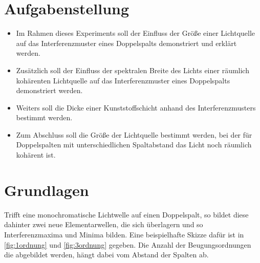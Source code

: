 \documentclass[11pt,ngerman]{scrartcl}
\begin{document}

\tableofcontents
\newpage

\section{Aufgabenstellung\label{Auf0}}

\begin{itemize}
	\item Im Rahmen dieses Experiments soll der Einfluss der Größe einer Lichtquelle auf das Interferenzmuster eines Doppelspalts demonstriert und erklärt werden.

	\item Zusätzlich soll der Einfluss der spektralen Breite des Lichts einer räumlich kohärenten Lichtquelle auf das Interferenzmuster eines Doppelspalts demonstriert werden.

	\item Weiters soll die Dicke einer Kunststoffschicht anhand des Interferenzmusters bestimmt werden.

	\item Zum Abschluss soll die Größe der Lichtquelle bestimmt werden, bei der für Doppelspalten mit unterschiedlichen Spaltabstand das Licht noch räumlich kohärent ist.
\end{itemize}


\section{Grundlagen}

Trifft eine monochromatische Lichtwelle auf einen Doppelspalt, so bildet diese dahinter zwei neue Elementarwellen, die sich überlagern und so Interferenzmaxima und Minima bilden. Eine beispielhafte Skizze dafür ist in \autoref{fig:1ordnung} und \autoref{fig:3ordnung} gegeben. Die Anzahl der Beugungsordnungen die abgebildet werden, hängt dabei vom Abstand der Spalten ab.
\end{document}
